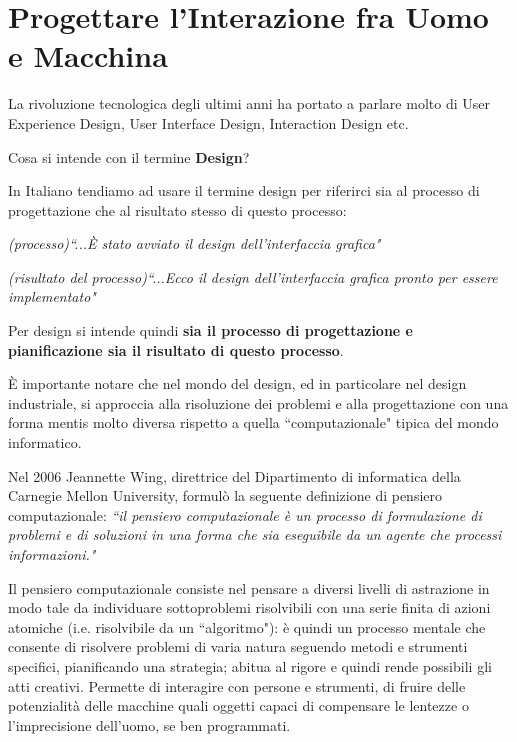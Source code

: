 \chapter{Progettare l'Interazione fra Uomo e Macchina}

La rivoluzione tecnologica degli ultimi anni ha portato a parlare molto di User Experience Design, User Interface Design, Interaction Design etc.

\vspace{\baselineskip}
Cosa si intende con il termine \textbf{Design}?
\vspace{\baselineskip}

In Italiano tendiamo ad usare il termine design per riferirci sia al processo di progettazione che al risultato stesso di questo processo:
\begin{flushleft}
    \textit{(processo)``...\`E stato avviato il design dell'interfaccia grafica"}

    \textit{(risultato del processo)``...Ecco il design dell'interfaccia grafica pronto per essere implementato"}
\end{flushleft}

Per design si intende quindi \textbf{sia il processo di progettazione e pianificazione sia il risultato di questo processo}.
 
\`E importante notare che nel mondo del design, ed in particolare nel design industriale, si approccia alla risoluzione dei problemi e alla progettazione
con una forma mentis molto diversa rispetto a quella ``computazionale" tipica del mondo informatico.

Nel 2006 Jeannette Wing, direttrice del Dipartimento di informatica della Carnegie Mellon University, formulò la seguente definizione di pensiero
computazionale:
\textit{``il pensiero computazionale è un processo di formulazione di problemi e di soluzioni in una forma che sia eseguibile da un agente che processi
informazioni."}

Il pensiero computazionale consiste nel pensare a diversi livelli di astrazione in modo tale da individuare sottoproblemi risolvibili con una serie finita
di azioni atomiche (i.e. risolvibile da un ``algoritmo"): è quindi un processo mentale che consente di risolvere problemi di varia natura seguendo
metodi e strumenti specifici, pianificando una strategia; abitua al rigore e quindi rende possibili gli atti creativi. Permette di interagire con
persone e strumenti, di fruire delle potenzialità delle macchine quali oggetti capaci di compensare le lentezze o l’imprecisione dell’uomo, se ben
programmati.

